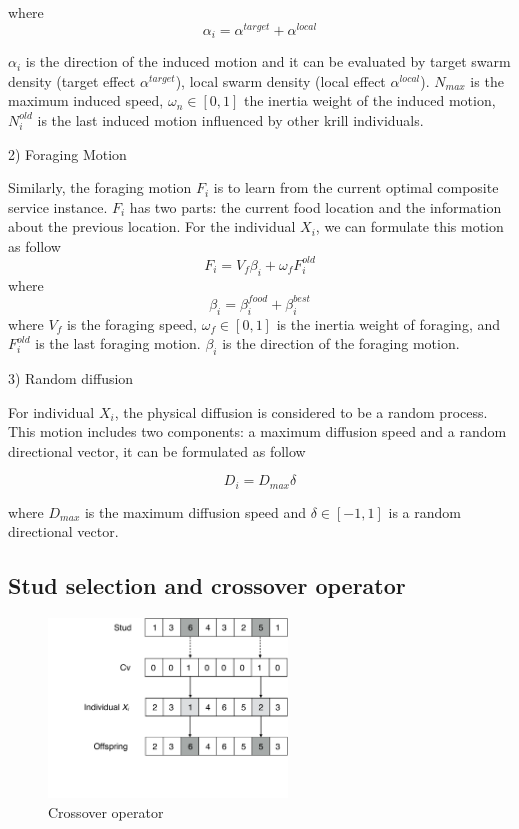 \documentclass[10pt,journal,compsoc]{IEEEtran}
\begin{document}
where
\begin{equation}
\alpha_i = \alpha^{target} + \alpha^{local}
\end{equation}

$\alpha_i$ is the direction of the induced motion and it can be evaluated by target swarm density (target effect $\alpha^{target}$), local swarm density (local effect $\alpha^{local}$). $N_{max}$ is the maximum induced speed, $\omega_n \in [0, 1]$ the inertia weight of the induced motion, $N^{old}_{i}$ is the last induced motion influenced by other krill individuals.

2) Foraging Motion

Similarly, the foraging motion $F_i$ is to learn from the current optimal composite service instance. 
$F_i$ has two parts: the current food location and the information about the previous location. 
For the individual $X_i$, we can formulate this motion as follow
\begin{equation}
F_i = V_f\beta_i + \omega_f F^{old}_i
\end{equation}
where
\begin{equation}
\beta_i = \beta_i^{food}+\beta_i^{best}
\end{equation}
where $V_f$ is the foraging speed, $\omega_f \in [0, 1]$ is the inertia weight of foraging, and $F^{old}_i$ is the last foraging motion. $\beta_i$ is the direction of the foraging motion.

3) Random diffusion

For individual $X_i$, the physical diffusion is considered to be a random process. This motion includes two components: a maximum diffusion speed and a random directional vector, it can be formulated as follow

\begin{equation}
D_i = D_{max}\delta
\end{equation}

where $D_{max}$ is the maximum diffusion speed and $\delta \in [-1, 1]$ is a random directional vector.

\subsection{Stud selection and crossover operator}

\begin{figure}[!t]
\centering
\includegraphics[width=2.5in]{./img/pic5.pdf}
\caption{Crossover operator}
\label{Crossover operator}
\end{figure}
\end{document}
